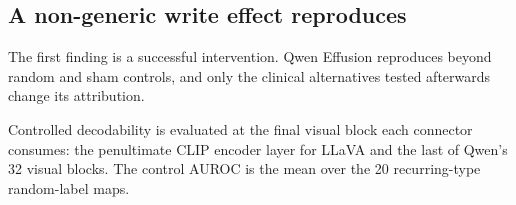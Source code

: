 \documentclass[11pt]{article}
\begin{document}
\begin{table}[tp]
\centering
\setlength{\tabcolsep}{3pt}

\caption{\textbf{Pilot replication on 600 new patients.} Qwen2.5-VL-7B on NIH ChestX-ray14, one row per concept. Columns include the concept write $W_{q,q}$, the random 95th percentile (p95), the absolute sham, and its rank among its own and the 119 random writes; blue shading marks a negative ownership contrast.}
\label{tab:cf-seed}
\end{table}


\subsection{A non-generic write effect reproduces}
\label{sec:qwen-replication}

The first finding is a successful intervention. Qwen Effusion reproduces beyond random and sham controls, and only the clinical alternatives tested afterwards change its attribution.

Controlled decodability is evaluated at the final visual block each connector consumes: the penultimate CLIP encoder layer for LLaVA and the last of Qwen's 32 visual blocks. The control AUROC is the mean over the 20 recurring-type random-label maps.
\end{document}
